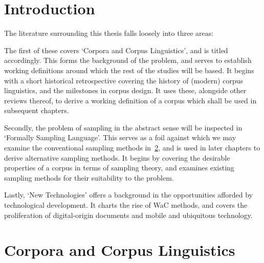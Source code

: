 \section{Introduction}
The literature surrounding this thesis falls loosely into three areas:  

The first of these covers `Corpora and Corpus Linguistics', and is titled accordingly.  This forms the background of the problem, and serves to establish working definitions around which the rest of the studies will be based.  It begins with a short historical retrospective covering the history of (modern) corpus linguistics, and the milestones in corpus design.  It uses these, alongside other reviews thereof, to derive a working definition of a corpus which shall be used in subsequent chapters.

Secondly, the problem of sampling in the abstract sense will be inspected in `Formally Sampling Language'.  This serves as a foil against which we may examine the conventional sampling methods in~\ref{sec:litreview-corpora}, and is used in later chapters  to derive alternative sampling methods.    It begins by covering the desirable properties of a corpus in terms of sampling theory, and examines existing sampling methods for their suitability to the problem.


Lastly, `New Technologies' offers a background in the opportunities afforded by technological development.  It charts the rise of WaC methods, and covers the proliferation of digital-origin documents and mobile and ubiquitous technology.




\section{Corpora and Corpus Linguistics}
\label{sec:litreview-corpora}




